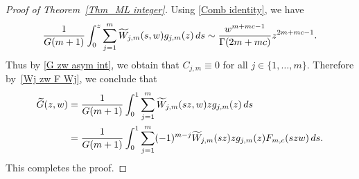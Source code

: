 \documentclass[11pt]{article}
\numberwithin{equation}{section}
\numberwithin{equation}{section}
\newcommand{\1}{\chi}
\begin{document}
\begin{proof}[Proof of Theorem~\ref{Thm_ML integer}]
	Using \eqref{Comb identity}, we have
	\begin{gather*}
	\frac{1}{G(m+1)}\int_0^z \sum_{j=1}^{m} 	\widetilde{W}_{j,m}(s,w) g_{j,m}(z)\,{\rm d}s \sim \frac{w^{m+mc-1}}{ \Gamma(2m+mc) } z^{2m+mc-1}.
	\end{gather*}
	Thus by \eqref{G zw asym int}, we obtain that $C_{j,m} \equiv 0$ for all $j \in \{1,\dots, m\}$.
	Therefore by~\eqref{Wj zw F Wj}, we conclude that
	\begin{align*}
		\widetilde{G}(z,w)&= \frac{1}{G(m+1)}\int_0^1 \sum_{j=1}^{m} 	\widetilde{W}_{j,m}(sz,w) z g_{j,m}(z)\,{\rm d}s
		\\
		&= \frac{1}{G(m+1)}\int_0^1 \sum_{j=1}^{m} (-1)^{m-j} 	\widetilde{W}_{j,m}(sz) z g_{j,m}(z)F_{m,c}(szw)\,{\rm d}s.
	\end{align*}
	This completes the proof.
\end{proof}
\end{document}
